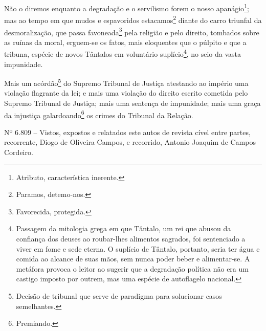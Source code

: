 Não o diremos enquanto a degradação e o servilismo forem o nosso
apanágio\footnote{Atributo, característica inerente.}; mas ao tempo em
que mudos e espavoridos estacamos\footnote{Paramos, detemo-nos.}
diante do carro triunfal da desmoralização, que passa
favoneada\footnote{Favorecida, protegida.} pela religião e pelo
direito, tombados sobre as ruínas da moral, erguem-se os fatos, mais
eloquentes que o púlpito e que a tribuna, espécie de novos Tântalos em
voluntário suplício\footnote{Passagem da mitologia grega em que
  Tântalo, um rei que abusou da confiança dos deuses ao roubar-lhes
  alimentos sagrados, foi sentenciado a viver em fome e sede eterna. O
  suplício de Tântalo, portanto, seria ter água e comida ao alcance de
  suas mãos, sem nunca poder beber e alimentar-se. A metáfora provoca o
  leitor ao sugerir que a degradação política não era um castigo imposto
  por outrem, mas uma espécie de autoflagelo nacional.}, no seio da
vasta impunidade.

Mais um acórdão\footnote{Decisão de tribunal que serve de paradigma
  para solucionar casos semelhantes.} do Supremo Tribunal de Justiça
atestando ao império uma violação flagrante da lei; e mais uma violação
do direito escrito cometida pelo Supremo Tribunal de Justiça; mais uma
sentença de impunidade; mais uma graça da injustiça
galardoando\footnote{Premiando.} os crimes do Tribunal da Relação.

Nº 6.809 -- Vistos, expostos e relatados este autos de revista cível
entre partes, recorrente, Diogo de Oliveira Campos, e recorrido, Antonio
Joaquim de Campos Cordeiro.

